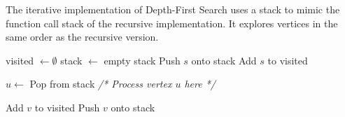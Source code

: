   \begin{algo}
    The iterative implementation of Depth-First Search uses a stack to mimic the function call stack of the recursive implementation. It explores vertices in the same order as the recursive version.
    \begin{algorithm}[H]
      \label{alg:dfs_iterative}
      \begin{algorithmic}[1]
        
          \State visited $\gets \emptyset$ 
          \State stack $\gets$ empty stack
          \State Push $s$ onto stack
          \State Add $s$ to visited
          
            \State $u \gets$ Pop from stack
            \State \textit{/* Process vertex $u$ here */}
            
                \State Add $v$ to visited
                \State Push $v$ onto stack
              \EndIf
            \EndFor
          \EndWhile
        \EndFunction
      \end{algorithmic}
    \end{algorithm}
  \end{algo}

